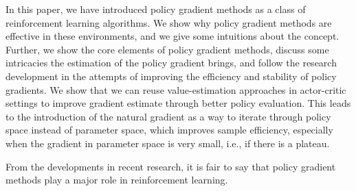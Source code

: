 In this paper, we have introduced policy gradient methods as a class of reinforcement learning algorithms. 
We show why policy gradient methods are effective in these environments, and we give some intuitions about the concept. 
Further, we show the core elements of policy gradient methods, discuss some intricacies the estimation of the policy gradient brings, and follow the research development in the attempts of improving the efficiency and stability of policy gradients.
We show that we can reuse value-estimation approaches in actor-critic settings to improve gradient estimate through better policy evaluation.
This leads to the introduction of the natural gradient as a way to iterate through policy space instead of parameter space, which improves sample efficiency, especially when the gradient in parameter space is very small, i.e., if there is a plateau.

From the developments in recent research, it is fair to say that policy gradient methods play a major role in reinforcement learning. 





